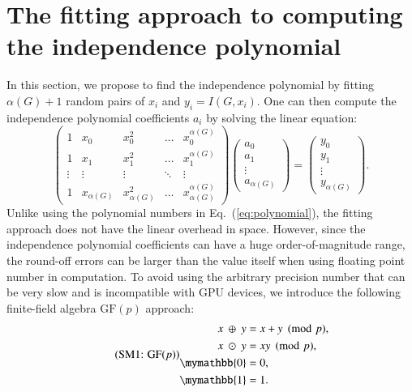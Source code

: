 \documentclass[onefignum, onetabnum]{siamart190516}
\newcommand{\eqname}[1]{\stepcounter{equation}\tag{\theequation : #1}}
\newcommand{\<}{\langle}
\renewcommand{\>}{\rangle}
\newcommand{\Eq}[1]{Eq.~(\ref{#1})}
\begin{document}
\section{The fitting approach to computing the independence polynomial}\label{sec:finitefield}
In this section, we propose to find the independence polynomial by fitting $\alpha(G)+1$ random pairs of $x_{i}$ and $y_{i} = I(G,x_{i})$. One can then compute the independence polynomial coefficients $a_{i}$ by solving the linear equation: 
\begin{equation}
\left(\begin{matrix}
1 & x_0 & x_0^2 & \ldots & x_0^{\alpha(G)} \\
1 & x_1 & x_1^2 & \ldots & x_1^{\alpha(G)} \\
\vdots & \vdots & \vdots &\ddots & \vdots \\
1 & x_{\alpha(G)} & x_{\alpha(G)}^2 & \ldots & x_{\alpha(G)}^{\alpha(G)}
\end{matrix}\right)
\left(\begin{matrix}
a_0 \\ a_1 \\ \vdots \\ a_{\alpha(G)}
\end{matrix}\right)
= \left(\begin{matrix}
y_0 \\ y_1 \\ \vdots \\ y_{\alpha(G)}
\end{matrix}\right).\label{eq:lineareq}
\end{equation}
Unlike using the polynomial numbers in \Eq{eq:polynomial},  the fitting approach does not have the linear overhead in space.
However, since the independence polynomial coefficients can have a huge order-of-magnitude range, the round-off errors can be larger than the value itself when using floating point number in computation.
To avoid using the arbitrary precision number that can be very slow and is incompatible with GPU devices, we introduce the following finite-field algebra $\text{GF}(p)$ approach:
\begin{equation}
\eqname{GF$(p)$}
\begin{split}
    x ~\oplus~ y &= x+y\pmod p,\\
    x ~\odot~ y &= xy\pmod p,\\
    \mymathbb{0} &= 0,\\
    \mymathbb{1} &= 1.
\end{split}\label{eq:finitefield}
\end{equation}
\end{document}
